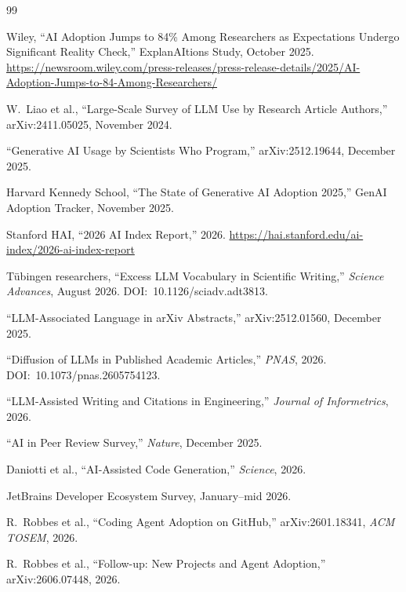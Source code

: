 \documentclass[11pt,a4paper]{article}
\begin{document}
\begin{thebibliography}{99}

Wiley, ``AI Adoption Jumps to 84\% Among Researchers as Expectations Undergo Significant Reality Check,'' ExplanAItions Study, October 2025. \url{https://newsroom.wiley.com/press-releases/press-release-details/2025/AI-Adoption-Jumps-to-84-Among-Researchers/}

W.~Liao et al., ``Large-Scale Survey of LLM Use by Research Article Authors,'' arXiv:2411.05025, November 2024.

``Generative AI Usage by Scientists Who Program,'' arXiv:2512.19644, December 2025.

Harvard Kennedy School, ``The State of Generative AI Adoption 2025,'' GenAI Adoption Tracker, November 2025.

Stanford HAI, ``2026 AI Index Report,'' 2026. \url{https://hai.stanford.edu/ai-index/2026-ai-index-report}

T\"{u}bingen researchers, ``Excess LLM Vocabulary in Scientific Writing,'' \emph{Science Advances}, August 2026. DOI:~10.1126/sciadv.adt3813.

``LLM-Associated Language in arXiv Abstracts,'' arXiv:2512.01560, December 2025.

``Diffusion of LLMs in Published Academic Articles,'' \emph{PNAS}, 2026. DOI:~10.1073/pnas.2605754123.

``LLM-Assisted Writing and Citations in Engineering,'' \emph{Journal of Informetrics}, 2026.

``AI in Peer Review Survey,'' \emph{Nature}, December 2025.

Daniotti et al., ``AI-Assisted Code Generation,'' \emph{Science}, 2026.

JetBrains Developer Ecosystem Survey, January--mid 2026.

R.~Robbes et al., ``Coding Agent Adoption on GitHub,'' arXiv:2601.18341, \emph{ACM TOSEM}, 2026.

R.~Robbes et al., ``Follow-up: New Projects and Agent Adoption,'' arXiv:2606.07448, 2026.


\end{thebibliography}
\end{document}
